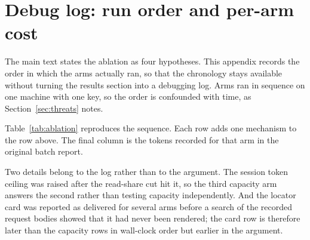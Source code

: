 \section{Debug log: run order and per-arm cost}
\label{app:debuglog}

The main text states the ablation as four hypotheses. This appendix records the order in which the arms actually ran, so that the chronology stays available without turning the results section into a debugging log. Arms ran in sequence on one machine with one key, so the order is confounded with time, as Section~\ref{sec:threats} notes.

Table~\ref{tab:ablation} reproduces the sequence. Each row adds one mechanism to the row above. The final column is the tokens recorded for that arm in the original batch report.



Two details belong to the log rather than to the argument. The session token ceiling was raised after the read-share cut hit it, so the third capacity arm answers the second rather than testing capacity independently. And the locator card was reported as delivered for several arms before a search of the recorded request bodies showed that it had never been rendered; the card row is therefore later than the capacity rows in wall-clock order but earlier in the argument.
